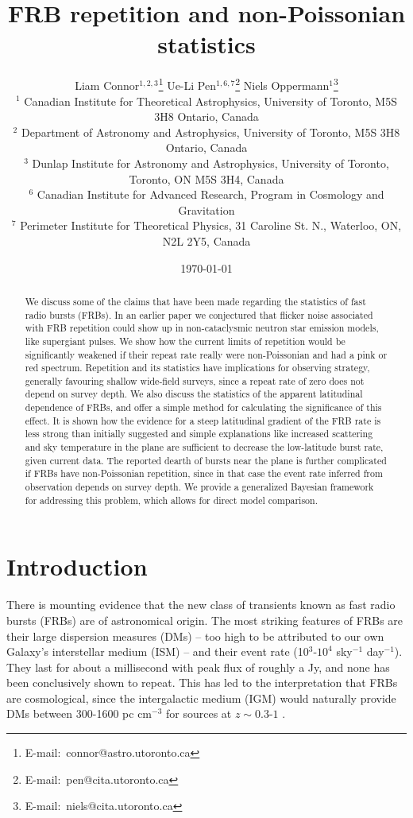 \documentclass[useAMS,usenatbib]{mn2e}
\title{FRB repetition and non-Poissonian statistics}
\author[Connor et al.]{
Liam Connor$^{1,2,3}$\thanks{E-mail:\ connor@astro.utoronto.ca}
Ue-Li Pen$^{1, 6, 7}$\thanks{E-mail:\ pen@cita.utoronto.ca}
Niels Oppermann$^{1}$\thanks{E-mail:\ niels@cita.utoronto.ca}
\\
$^1$ Canadian Institute for Theoretical Astrophysics, University of Toronto, M5S 3H8 Ontario, Canada
\\
$^2$ Department of Astronomy and Astrophysics, University of Toronto, 
M5S 3H8 Ontario, Canada
\\
$^3$ Dunlap Institute for Astronomy and Astrophysics, University of Toronto,
Toronto, ON M5S 3H4, Canada
\\
$^6$ Canadian Institute for Advanced Research, Program in Cosmology
and Gravitation
\\
$^7$ Perimeter Institute for Theoretical Physics, 31 Caroline St. N., Waterloo, ON, N2L 2Y5, Canada
}
\begin{document}
\date{\today}
\pagerange{\pageref{firstpage}--\pageref{lastpage}} 
\maketitle
\label{firstpage}

\begin{abstract}
We discuss some of the claims that have been made regarding the statistics of 
fast radio bursts (FRBs). In an earlier paper \citep{2015arXiv150505535C} 
we conjectured that flicker noise associated 
with FRB repetition could show up in non-cataclysmic neutron star emission models,
like supergiant pulses. We show how the current limits of repetition 
would be significantly weakened if their repeat rate really were non-Poissonian
and had a pink or red spectrum.
Repetition and its statistics have implications for observing strategy, generally favouring 
shallow wide-field surveys, since a repeat rate of zero does not depend on survey depth. 
We also discuss the statistics of the apparent latitudinal dependence of FRBs, and offer
a simple method for calculating the significance of this effect. It is shown how 
the evidence for a steep latitudinal gradient of the FRB rate is less strong than initially suggested 
and simple explanations like increased scattering and sky temperature 
in the plane are sufficient to decrease the low-latitude burst rate, given current data.
The reported dearth of bursts near the plane is further complicated if FRBs have 
non-Poissonian repetition, since in that case the event rate inferred from observation
depends on survey depth. We provide a generalized Bayesian framework for addressing 
this problem, which allows for direct model comparison. 

\end{abstract}
\begin{keywords}
\end{keywords}

\newcommand{\be}{\begin{eqnarray}}
\newcommand{\ee}{\end{eqnarray}}
\newcommand{\beq}{\begin{equation}}
\newcommand{\eeq}{\end{equation}}

\section{Introduction}
There is mounting evidence that the new class of transients 
known as fast radio bursts (FRBs) are of astronomical origin.
The most striking features of FRBs are their large dispersion
measures (DMs) -- too high to be attributed to our own Galaxy's
interstellar medium (ISM) --
and their event rate (10$^3$-$10^4$ sky$^{-1}$ day$^{-1}$). They
last for about a millisecond with peak flux of roughly a Jy, and none
has been conclusively shown to repeat. This has led to the 
interpretation that FRBs are cosmological,
since the intergalactic medium (IGM) would naturally provide
DMs between 300-1600 pc cm$^{-3}$ for sources at 
$z\sim0.3$-$1$ \citep{2013Sci...341...53T}. 
\end{document}
